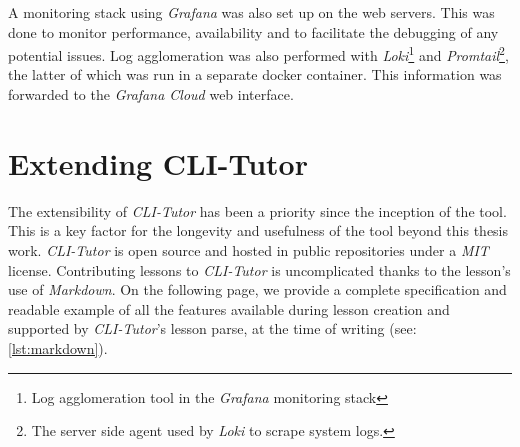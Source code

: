 A monitoring stack using \textit{Grafana} was also set up on the web servers.
This was done to monitor performance, availability and to facilitate
the debugging of any potential issues. Log agglomeration was also performed
with \textit{Loki}\footnote{Log agglomeration tool in the \textit{Grafana}
monitoring stack} and \textit{Promtail}\footnote{The server side agent used by 
    \textit{Loki} to scrape system logs.}, the latter of which was run in a
    separate docker container. This information was forwarded to the
    \textit{Grafana Cloud} web interface.

\section{Extending CLI-Tutor}

The extensibility of \textit{CLI-Tutor} has been a priority since the inception
of the tool. This is a key factor for the longevity and usefulness of the tool
beyond this thesis work. \textit{CLI-Tutor} is open source and hosted in public
repositories under a \textit{MIT}\cite{mitlicense} license. Contributing
lessons to \textit{CLI-Tutor} is uncomplicated thanks to the lesson's use of
\textit{Markdown}. On the following page, we provide a complete
specification and readable example of all the features available during lesson
creation and supported by \textit{CLI-Tutor}'s lesson parse, at the time of
writing (see: \autoref{lst:markdown}).


